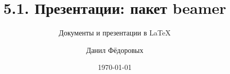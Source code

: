 \documentclass{beamer}
\begin{document}
\DeclareMathOperator{\sgn}{\mathop{sgn}}

\newcommand*{\hm}[1]{#1\nobreak\discretionary{}
{\hbox{$\mathsurround=0pt #1$}}{}}

\usepackage{graphicx}  %
\graphicspath{{images/}{images2/}}  %
\setlength\fboxsep{3pt} %
\setlength\fboxrule{1pt} %
\usepackage{wrapfig} %

\usepackage{array,tabularx,tabulary,booktabs} %
\usepackage{longtable}  %
\usepackage{multirow} %

\usepackage{etoolbox} %

\usepackage{lastpage} %
\usepackage{soul} %
\usepackage{csquotes} %
\usepackage{multicol} %

\usepackage{tikz} %
\usepackage{pgfplots}
\usepackage{pgfplotstable}

\title{5.1. Презентации: пакет beamer}
\subtitle{Документы и презентации в \LaTeX}
\author{Данил Фёдоровых}
\date{\today}
\end{document}
